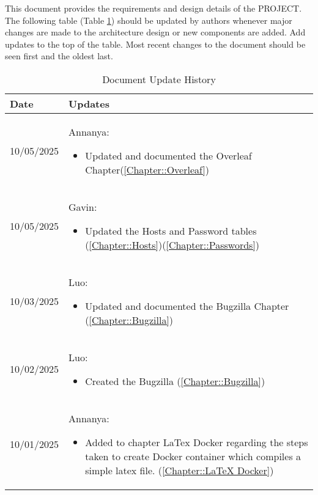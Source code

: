 This document provides the requirements and design details of the
PROJECT.  The following table (Table \ref{Table::UpdateHistory}) should be
updated by authors whenever major changes are made to the architecture
design or new components are added. Add updates to the top of the table.  
Most recent changes to the document should be seen first and the oldest 
last.

\begin{longtable}{|l||p{13.5cm}|}
\caption{Document Update History \label{Table::UpdateHistory}}\\
\hline
\textbf{Date} & \textbf{Updates} \\
\hline 
\endhead

10/05/2025 & Annanya:
\begin{itemize}[topsep=0pt,itemsep=0pt,parsep=0pt,partopsep=0pt,leftmargin=12pt]
\item Updated and documented the Overleaf Chapter(\ref{Chapter::Overleaf})
\end{itemize} 
\\ \hline

10/05/2025 & Gavin:
\begin{itemize}[topsep=0pt,itemsep=0pt,parsep=0pt,partopsep=0pt,leftmargin=12pt]
\item Updated the Hosts and Password tables (\ref{Chapter::Hosts})(\ref{Chapter::Passwords})
\end{itemize} 
\\ \hline

10/03/2025 & Luo:
\begin{itemize}[topsep=0pt,itemsep=0pt,parsep=0pt,partopsep=0pt,leftmargin=12pt]
\item Updated and documented the Bugzilla Chapter (\ref{Chapter::Bugzilla})
\end{itemize} 
\\ \hline

10/02/2025 & Luo:
\begin{itemize}[topsep=0pt,itemsep=0pt,parsep=0pt,partopsep=0pt,leftmargin=12pt]
\item Created the Bugzilla (\ref{Chapter::Bugzilla})
\end{itemize} 
\\ \hline

10/01/2025 & Annanya:
\begin{itemize}[topsep=0pt,itemsep=0pt,parsep=0pt,partopsep=0pt,leftmargin=12pt]
\item Added to chapter LaTex Docker regarding the steps taken to create Docker container which compiles a simple latex file. (\ref{Chapter::LaTeX Docker})
\end{itemize} 
\\ \hline


\end{longtable}

